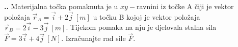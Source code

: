 

\noindent 
\textbf{
\thecjelina.\thezadatak.}
Materijalna točka pomaknuta je u $xy-$ravnini iz točke A čiji je vektor položaja $\vec{r}_A=\vec{i}+2\vec{j}\ \left[m\right]$ u točku B kojoj je vektor položaja 
$\vec{r}_B=2\vec{i}-3\vec{j}\ \left[m\right]$. Tijekom pomaka na nju je djelovala stalna sila $\vec{F}=3\vec{i}+4\vec{j}\ \left[N\right]$.
Izračunajte rad sile $\vec{F}$.

